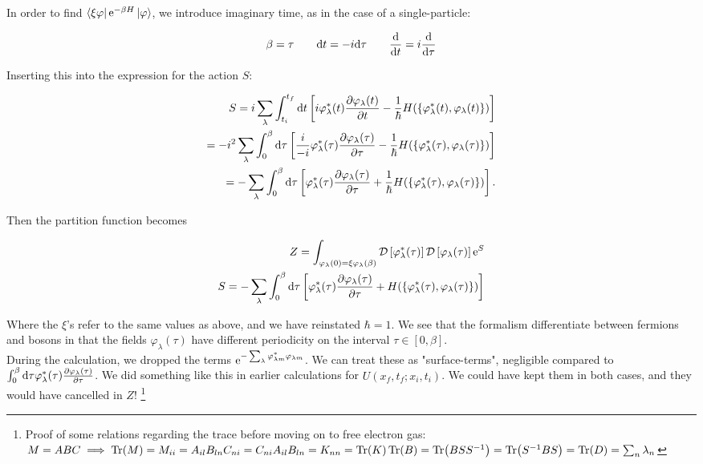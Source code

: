 In order to find $\bra{\xi \varphi} \mathrm{e}^{-\beta H} \ket{\varphi}$, we introduce imaginary time, as in the case of a single-particle: 

\begin{align*}
    \beta = \tau \quad \quad \dd t = -i \dd \tau \quad \quad 
    \dv{}{t} = i \dv{}{\tau} 
\end{align*}

Inserting this into the expression for the action $S$: 

\begin{align*}
    S = i \sum_{\lambda} \int_{t_{i}}^{t_{f}} \dd t \left[ i \varphi_{\lambda}^{*}(t) \pdv{\varphi_{\lambda}(t)}{t} - \frac{1}{\hbar}H(\{\varphi_{\lambda}^{*}(t), \varphi_{\lambda} (t)\} )  \right] \\ = - i^{2} \sum_{\lambda} \int_{0}^{\beta} \dd \tau \left[ \frac{i}{-i} \varphi_{\lambda}^{*}(\tau) \pdv{\varphi_{\lambda}(\tau)}{\tau} - \frac{1}{\hbar}H(\{\varphi_{\lambda}^{*}(\tau), \varphi_{\lambda} (\tau)\} )  \right] \\ = - \sum_{\lambda} \int_{0}^{\beta} \dd \tau \left[\varphi_{\lambda}^{*}(\tau) \pdv{\varphi_{\lambda}(\tau)}{\tau} + \frac{1}{\hbar}H(\{\varphi_{\lambda}^{*}(\tau), \varphi_{\lambda} (\tau)\} )  \right]. 
\end{align*} 

Then the partition function becomes 

\begin{align}
    Z = \int_{\varphi_{\lambda}(0) = \xi\varphi_{\lambda}(\beta)} \mathcal{D} \left[\varphi_{\lambda}^{*}(\tau)\right] \mathcal{D} \left[ \varphi_{\lambda} (\tau)\right] \mathrm{e}^{S} \\
    S = - \sum_{\lambda} \int_{0}^{\beta} \dd \tau \left[\varphi_{\lambda}^{*}(\tau) \pdv{\varphi_{\lambda}(\tau)}{\tau} + H(\{\varphi_{\lambda}^{*}(\tau), \varphi_{\lambda} (\tau)\} )  \right] \nonumber
\end{align}

Where the $\xi$'s refer to the same values as above, and we have reinstated $\hbar = 1$. We see that the formalism differentiate between fermions and bosons in that the fields $\varphi_{\lambda}(\tau)$ have different periodicity on the interval $ \tau \in [0, \beta]$. \\

During the calculation, we dropped the terms $\mathrm{e}^{-\sum_{\lambda} \varphi_{\lambda m}^{*}\varphi_{\lambda m}}$. We can treat these as "surface-terms", negligible compared to $\int_{0}^{\beta} \dd \tau \varphi_{\lambda}^{*}(\tau) \pdv{\varphi_{\lambda}(\tau)}{\tau}$. We did something like this in earlier calculations for $U(x_{f}, t_{f}; x_{i}, t_{i})$. We could have kept them in both cases, and they would have cancelled in $Z$! 
\footnote{Proof of some relations regarding the trace before moving on to free electron gas: $M = ABC \implies \Tr(M) = M_{ii} = A_{il}B_{ln}C_{ni} = C_{ni}A_{il}B_{ln} = K_{nn} = \Tr(K) 
    \Tr(B) = \Tr(BSS^{-1}) = \Tr(S^{-1}BS) = \Tr(D) = \sum_{n} \lambda_{n}$}


